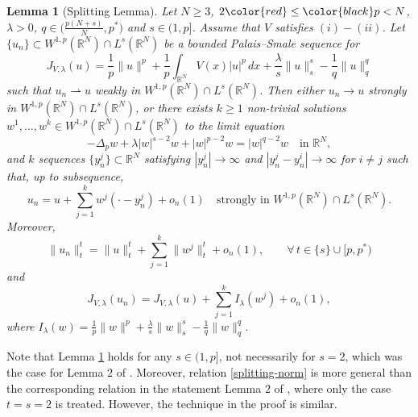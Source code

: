\documentclass[11pt,reqno]{amsart}
\newtheorem{lemma}[theorem]{Lemma}
\theoremstyle{definition}
\numberwithin{equation}{section}
\numberwithin{theorem}{section}
\numberwithin{equation}{section}
\numberwithin{theorem}{section}
\begin{document}
\begin{lemma}[Splitting Lemma]
\label{splitting-lemma}
Let $N \geq 3$, $2 \color{red}\le \color{black}p < N$, $\lambda>0$, $q \in \bigl( \frac{p(N+s)}{N}, p^* \bigr)$ and $s\in(1,p]$.
Assume that $V$ satisfies $(i)-(ii)$. Let $\{u_n\} \subset W^{1,p}(\mathbb{R}^N) \cap L^s(\mathbb{R}^N)$ be a bounded Palais--Smale sequence for
\[
J_{V,\lambda}(u) = \frac{1}{p} \|u\|^p + \frac{1}{p} \int_{\mathbb{R}^N}V(x)|u|^p \, dx + \frac{\lambda}{s} \|u\|_s^s - \frac{1}{q} \|u\|_q^q
\]
such that $u_n \rightharpoonup u$ weakly in $W^{1,p}(\mathbb{R}^N) \cap L^s(\mathbb{R}^N)$. Then either $u_n \to u$ strongly in $W^{1,p}(\mathbb{R}^N) \cap L^s(\mathbb{R}^N)$, or there exists $k \geq 1$ non-trivial solutions $w^1, \dots, w^k \in W^{1,p}(\mathbb{R}^N) \cap L^s(\mathbb{R}^N)$ to the limit equation
\[
-\Delta_p w + \lambda |w|^{s-2}w + |w|^{p-2} w = |w|^{q-2} w \quad \text{in } \mathbb{R}^N,
\]
and $k$ sequences $\{y_n^j\} \subset \mathbb{R}^N$ satisfying $|y_n^j| \to \infty$ and $|y_n^j - y_n^i| \to \infty$ for $i \neq j$ such that, up to subsequence,
\[
u_n = u + \sum_{j=1}^k w^j(\cdot - y_n^j) + o_n(1) \quad \text{strongly in } W^{1,p}(\mathbb{R}^N) \cap L^s(\mathbb{R}^N).
\]
Moreover,
\begin{equation}\label{splitting-norm}
\|u_n\|_t^t = \|u\|_t^t + \sum_{j=1}^k \|w^j\|_t^t + o_n(1),\qquad\forall\, t\in\{s\}\cup[p,p^*)
\end{equation}
and
\begin{equation}\label{splitting-energy}
J_{V,\lambda}(u_n) = J_{V,\lambda}(u) + \sum_{j=1}^k I_\lambda(w^j) + o_n(1),
\end{equation}
where $I_\lambda(w) = \frac{1}{p} \|w\|^p + \frac{\lambda}{s} \|w\|_s^s - \frac{1}{q} \|w\|_q^q$.
\end{lemma}
Note that Lemma \ref{splitting-lemma} holds for any $s\in(1,p]$, not necessarily for $s=2$, which was the case for Lemma $2$ of \cite{dhara2025normalised}. Moreover, relation \eqref{splitting-norm} is more general than the corresponding relation in the statement Lemma $2$ of \cite{dhara2025normalised}, where only the case $t=s=2$ is treated. However, the technique in the proof is similar.
\end{document}
